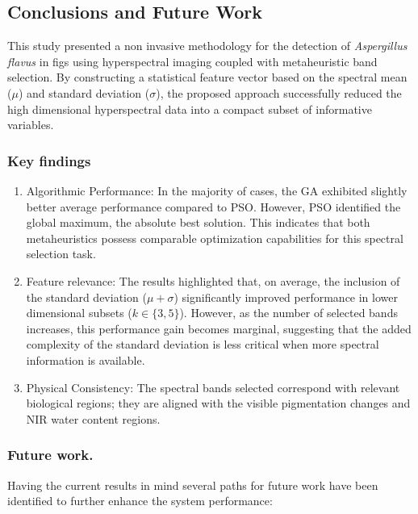 \documentclass[aipa,article,submit,pdftex,moreauthors]{Definitions/mdpi}
\begin{document}
\subsection{Conclusions and Future Work}
This study presented a non invasive methodology for the detection of \textit{Aspergillus flavus} in figs using hyperspectral imaging coupled with metaheuristic band selection. 
By constructing a statistical feature vector based on the spectral mean ($\mu$) and standard deviation ($\sigma$), the proposed approach successfully reduced the high dimensional hyperspectral data into a compact subset of informative variables.

\subsubsection{Key findings}
\begin{enumerate}
    \item Algorithmic Performance: In the majority of cases, the GA exhibited slightly better average performance compared to PSO. However, PSO identified the global maximum, the absolute best solution. This indicates that both metaheuristics possess comparable optimization capabilities for this spectral selection task.
    \item Feature relevance: The results highlighted that, on average, the inclusion of the standard deviation ($\mu+\sigma$) significantly improved performance in lower dimensional subsets ($k\in\{3,5\}$). However, as the number of selected bands increases, this performance gain becomes marginal, suggesting that the added complexity of the standard deviation is less critical when more spectral information is available.
    \item Physical Consistency: The spectral bands selected correspond with relevant biological regions; they are aligned with the visible pigmentation changes and NIR water content regions. 
\end{enumerate}

\subsubsection{Future work.}
Having the current results in mind several paths for future work have been identified to further enhance the system performance:
\end{document}
